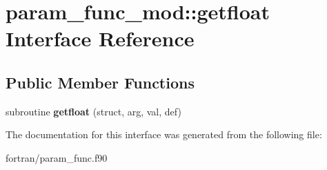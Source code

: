 \hypertarget{interfaceparam__func__mod_1_1getfloat}{}\section{param\+\_\+func\+\_\+mod\+:\+:getfloat Interface Reference}
\label{interfaceparam__func__mod_1_1getfloat}
\subsection*{Public Member Functions}
\begin{DoxyCompactItemize}
\item 
\mbox{\label{interfaceparam__func__mod_1_1getfloat_ac92eab785292d37de8eb1887b46328ef}} 
subroutine {\bfseries getfloat} (struct, arg, val, def)
\end{DoxyCompactItemize}


The documentation for this interface was generated from the following file\+:\begin{DoxyCompactItemize}
\item 
fortran/param\+\_\+func.\+f90\end{DoxyCompactItemize}
